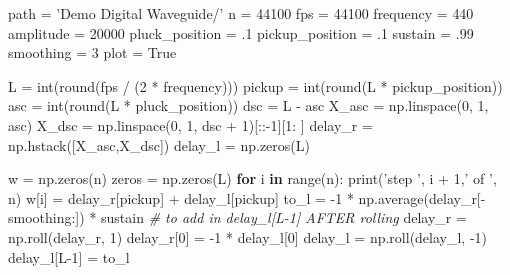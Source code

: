 \documentclass[]{article}
\newenvironment{Shaded}{}{}
\newcommand{\BuiltInTok}[1]{#1}
\newcommand{\CommentTok}[1]{\textcolor[rgb]{0.38,0.63,0.69}{\textit{#1}}}
\newcommand{\ControlFlowTok}[1]{\textcolor[rgb]{0.00,0.44,0.13}{\textbf{#1}}}
\newcommand{\DecValTok}[1]{\textcolor[rgb]{0.25,0.63,0.44}{#1}}
\newcommand{\FloatTok}[1]{\textcolor[rgb]{0.25,0.63,0.44}{#1}}
\newcommand{\KeywordTok}[1]{\textcolor[rgb]{0.00,0.44,0.13}{\textbf{#1}}}
\newcommand{\NormalTok}[1]{#1}
\newcommand{\OperatorTok}[1]{\textcolor[rgb]{0.40,0.40,0.40}{#1}}
\newcommand{\StringTok}[1]{\textcolor[rgb]{0.25,0.44,0.63}{#1}}
\newcommand{\VariableTok}[1]{\textcolor[rgb]{0.10,0.09,0.49}{#1}}
\begin{document}
\begin{Shaded}
\begin{Highlighting}[numbers=left,,]
\NormalTok{path }\OperatorTok{=} \StringTok{'Demo Digital Waveguide/'}
\NormalTok{n }\OperatorTok{=} \DecValTok{44100}
\NormalTok{fps }\OperatorTok{=} \DecValTok{44100}
\NormalTok{frequency }\OperatorTok{=} \DecValTok{440}
\NormalTok{amplitude }\OperatorTok{=} \DecValTok{20000}
\NormalTok{pluck_position }\OperatorTok{=} \FloatTok{.1}
\NormalTok{pickup_position }\OperatorTok{=} \FloatTok{.1}
\NormalTok{sustain }\OperatorTok{=} \FloatTok{.99}
\NormalTok{smoothing }\OperatorTok{=} \DecValTok{3}
\NormalTok{plot }\OperatorTok{=} \VariableTok{True}

\NormalTok{L }\OperatorTok{=} \BuiltInTok{int}\NormalTok{(}\BuiltInTok{round}\NormalTok{(fps }\OperatorTok{/}\NormalTok{ (}\DecValTok{2} \OperatorTok{*}\NormalTok{ frequency)))}
\NormalTok{pickup }\OperatorTok{=} \BuiltInTok{int}\NormalTok{(}\BuiltInTok{round}\NormalTok{(L }\OperatorTok{*}\NormalTok{ pickup_position))}
\NormalTok{asc }\OperatorTok{=} \BuiltInTok{int}\NormalTok{(}\BuiltInTok{round}\NormalTok{(L }\OperatorTok{*}\NormalTok{ pluck_position))}
\NormalTok{dsc }\OperatorTok{=}\NormalTok{ L }\OperatorTok{-}\NormalTok{ asc}
\NormalTok{X_asc }\OperatorTok{=}\NormalTok{ np.linspace(}\DecValTok{0}\NormalTok{, }\DecValTok{1}\NormalTok{, asc)}
\NormalTok{X_dsc }\OperatorTok{=}\NormalTok{ np.linspace(}\DecValTok{0}\NormalTok{, }\DecValTok{1}\NormalTok{, dsc }\OperatorTok{+} \DecValTok{1}\NormalTok{)[::}\OperatorTok{-}\DecValTok{1}\NormalTok{][}\DecValTok{1}\NormalTok{: ]}
\NormalTok{delay_r }\OperatorTok{=}\NormalTok{ np.hstack([X_asc,X_dsc])}
\NormalTok{delay_l }\OperatorTok{=}\NormalTok{ np.zeros(L)}

\NormalTok{w }\OperatorTok{=}\NormalTok{ np.zeros(n)}
\NormalTok{zeros }\OperatorTok{=}\NormalTok{ np.zeros(L)}
\ControlFlowTok{for}\NormalTok{ i }\KeywordTok{in} \BuiltInTok{range}\NormalTok{(n):}
  \BuiltInTok{print}\NormalTok{(}\StringTok{'step '}\NormalTok{, i }\OperatorTok{+} \DecValTok{1}\NormalTok{,}\StringTok{' of '}\NormalTok{, n)}
\NormalTok{  w[i] }\OperatorTok{=}\NormalTok{ delay_r[pickup] }\OperatorTok{+}\NormalTok{ delay_l[pickup]}
\NormalTok{  to_l }\OperatorTok{=} \DecValTok{-1} \OperatorTok{*}\NormalTok{ np.average(delay_r[}\OperatorTok{-}\NormalTok{smoothing:]) }\OperatorTok{*}\NormalTok{ sustain }\CommentTok{# to add in delay_l[L-1] AFTER rolling}
\NormalTok{  delay_r }\OperatorTok{=}\NormalTok{ np.roll(delay_r, }\DecValTok{1}\NormalTok{)}
\NormalTok{  delay_r[}\DecValTok{0}\NormalTok{] }\OperatorTok{=} \DecValTok{-1} \OperatorTok{*}\NormalTok{ delay_l[}\DecValTok{0}\NormalTok{]}
\NormalTok{  delay_l }\OperatorTok{=}\NormalTok{ np.roll(delay_l, }\DecValTok{-1}\NormalTok{)}
\NormalTok{  delay_l[L}\DecValTok{-1}\NormalTok{] }\OperatorTok{=}\NormalTok{ to_l}
\end{Highlighting}
\end{Shaded}
\end{document}
